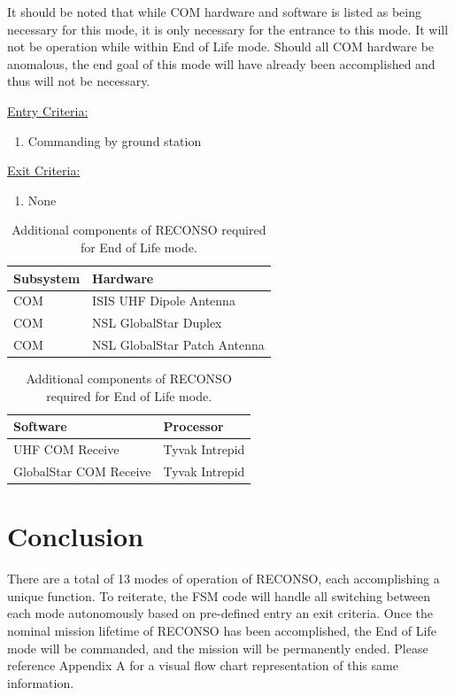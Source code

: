 \documentclass{article}
\begin{document}
It should be noted that while COM hardware and software is listed as being necessary for this mode, it is only necessary for the entrance to this mode. It will not be operation while within End of Life mode. Should all COM hardware be anomalous, the end goal of this mode will have already been accomplished and thus will not be necessary.

\underline{Entry Criteria:} 

\begin{enumerate}
\item Commanding by ground station
\end{enumerate}

\underline{Exit Criteria:}

\begin{enumerate}
\item None
\end{enumerate}

\begin{table}[h!]
\caption{Additional components of RECONSO required for End of Life mode.}
\begin{adjustbox}{center}
\begin{tabular}{|l|l|}
\hline
Subsystem & Hardware \\ \hline \hline
COM & ISIS UHF Dipole Antenna  \\ \hline
COM & NSL GlobalStar Duplex  \\ \hline
COM & NSL GlobalStar Patch Antenna \\ \hline
\end{tabular}

\quad

\begin{tabular}{|l|l|}
\hline
Software & Processor \\ \hline \hline
UHF COM Receive & Tyvak Intrepid \\ \hline
GlobalStar COM Receive & Tyvak Intrepid \\ \hline
\end{tabular}
\end{adjustbox}
\end{table}

\newpage
\section{Conclusion}

There are a total of 13 modes of operation of RECONSO, each accomplishing a unique function. To reiterate, the FSM code will handle all switching between each mode autonomously based on pre-defined entry an exit criteria. Once the nominal mission lifetime of RECONSO has been accomplished, the End of Life mode will be commanded, and the mission will be permanently ended. Please reference Appendix A for a visual flow chart representation of this same information.
\end{document}
